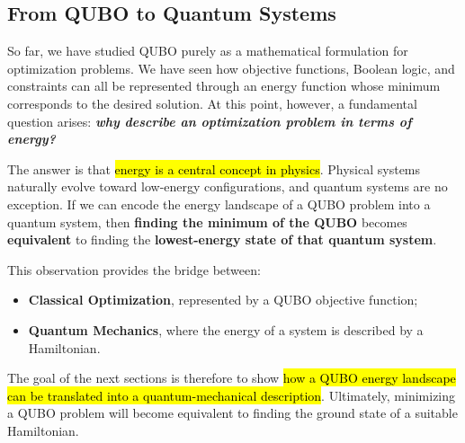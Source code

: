 \subsection{From QUBO to Quantum Systems}\label{sec:from-qubo-to-quantum-systems}

So far, we have studied QUBO purely as a mathematical formulation for optimization problems. We have seen how objective functions, Boolean logic, and constraints can all be represented through an energy function whose minimum corresponds to the desired solution. At this point, however, a fundamental question arises: \textbf{\emph{why describe an optimization problem in terms of energy?}}

\highspace
The answer is that \hl{energy is a central concept in physics}. Physical systems naturally evolve toward low-energy configurations, and quantum systems are no exception. If we can encode the energy landscape of a QUBO problem into a quantum system, then \textbf{finding the minimum of the QUBO} becomes \textbf{equivalent} to finding the \textbf{lowest-energy state of that quantum system}.

\highspace
This observation provides the bridge between:
\begin{itemize}
    \item \textbf{Classical Optimization}, represented by a QUBO objective function;
    \item \textbf{Quantum Mechanics}, where the energy of a system is described by a Hamiltonian.
\end{itemize}
The goal of the next sections is therefore to show \hl{how a QUBO energy landscape can be translated into a quantum-mechanical description}. Ultimately, minimizing a QUBO problem will become equivalent to finding the ground state of a suitable Hamiltonian.